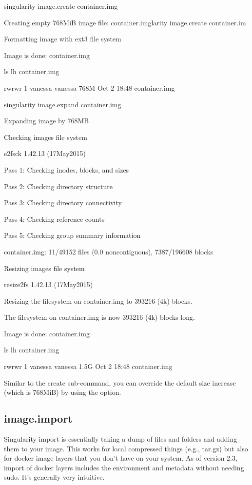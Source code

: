 \documentclass[letterpaper,10pt,english]{sphinxmanual}
\begin{document}
%
\begin{sphinxVerbatim}[commandchars=\\\{\}]
\PYGZdl{} singularity image.create container.img

Creating empty 768MiB image file: container.imglarity image.create container.im

Formatting image with ext3 file system

Image is done: container.img


\PYGZdl{} ls \PYGZhy{}lh container.img

\PYGZhy{}rw\PYGZhy{}rw\PYGZhy{}r\PYGZhy{}\PYGZhy{} 1 vanessa vanessa 768M Oct  2 18:48 container.img


\PYGZdl{} singularity image.expand container.img

Expanding image by 768MB

Checking image\PYGZsq{}s file system

e2fsck 1.42.13 (17\PYGZhy{}May\PYGZhy{}2015)

Pass 1: Checking inodes, blocks, and sizes

Pass 2: Checking directory structure

Pass 3: Checking directory connectivity

Pass 4: Checking reference counts

Pass 5: Checking group summary information

container.img: 11/49152 files (0.0\PYGZpc{} non\PYGZhy{}contiguous), 7387/196608 blocks

Resizing image\PYGZsq{}s file system

resize2fs 1.42.13 (17\PYGZhy{}May\PYGZhy{}2015)

Resizing the filesystem on container.img to 393216 (4k) blocks.

The filesystem on container.img is now 393216 (4k) blocks long.

Image is done: container.img


\PYGZdl{} ls \PYGZhy{}lh container.img

\PYGZhy{}rw\PYGZhy{}rw\PYGZhy{}r\PYGZhy{}\PYGZhy{} 1 vanessa vanessa 1.5G Oct  2 18:48 container.img
\end{sphinxVerbatim}

Similar to the create sub-command, you can override the default size
increase (which is 768MiB) by using the  option.


\subsection{image.import}
\label{\detokenize{appendix:id43}}\label{\detokenize{appendix:sec-imageimport}}
Singularity import is essentially taking a dump of files and folders
and adding them to your image. This works for local compressed things
(e.g., tar.gz) but also for docker image layers that you don’t have on
your system. As of version 2.3, import of docker layers includes the
environment and metadata without needing sudo. It’s generally very
intuitive.
\end{document}
